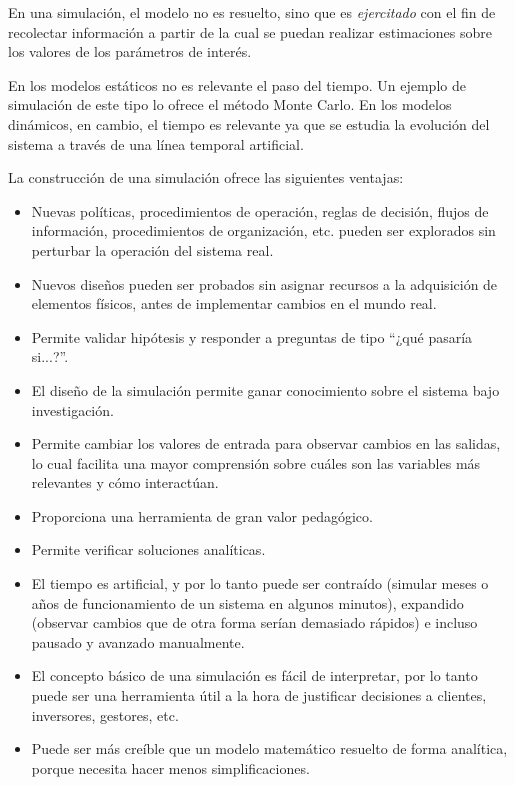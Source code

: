 En una simulación, el modelo no es resuelto, sino que es \textit{ejercitado}
con el fin de recolectar información a partir de la cual se puedan realizar
estimaciones sobre los valores de los parámetros de interés.


En los modelos estáticos no es relevante el paso del tiempo. Un ejemplo de
simulación de este tipo lo ofrece el método Monte Carlo. En los modelos
dinámicos, en cambio, el tiempo es relevante ya que se estudia la evolución del
sistema a través de una línea temporal artificial.

La construcción de una simulación ofrece las siguientes ventajas:
\begin{itemize}
    \item Nuevas políticas, procedimientos de operación, reglas de decisión,
flujos de información, procedimientos de organización, etc. pueden ser
explorados sin perturbar la operación del sistema real.

    \item Nuevos diseños pueden ser probados sin asignar recursos a la
adquisición de elementos físicos, antes de implementar cambios en el mundo
real.

    \item Permite validar hipótesis y responder a preguntas de tipo ``¿qué
pasaría si...?''.

    \item El diseño de la simulación permite ganar conocimiento sobre el
sistema bajo investigación.

    \item Permite cambiar los valores de entrada para observar cambios en las
salidas, lo cual facilita una mayor comprensión sobre cuáles son las variables
más relevantes y cómo interactúan.

    \item Proporciona una herramienta de gran valor pedagógico.

    \item Permite verificar soluciones analíticas.

    \item El tiempo es artificial, y por lo tanto puede ser contraído (simular
meses o años de funcionamiento de un sistema en algunos minutos), expandido
(observar cambios que de otra forma serían demasiado rápidos) e incluso pausado
y avanzado manualmente.

    \item El concepto básico de una simulación es fácil de interpretar, por lo
tanto puede ser una herramienta útil a la hora de justificar decisiones a
clientes, inversores, gestores, etc.

    \item Puede ser más creíble que un modelo matemático resuelto de forma
analítica, porque necesita hacer menos simplificaciones.
\end{itemize}

